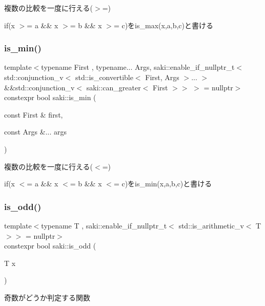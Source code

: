 複数の比較を一度に行える($>$=) 

if(x $>$= a \&\& x $>$= b \&\& x $>$= c)をis\+\_\+max(x,a,b,c)と書ける \mbox{\label{namespacesaki_a761604ec865e518ea0ba335b709be060}} 
\subsubsection{\texorpdfstring{is\+\_\+min()}{is\_min()}}
{\footnotesize\ttfamily template$<$typename First , typename... Args, saki\+::enable\+\_\+if\+\_\+nullptr\+\_\+t$<$ std\+::conjunction\+\_\+v$<$ std\+::is\+\_\+convertible$<$ First, Args $>$... $>$ \&\&std\+::conjunction\+\_\+v$<$ saki\+::can\+\_\+greater$<$ First $>$$>$ $>$  = nullptr$>$ \\
constexpr bool saki\+::is\+\_\+min (\begin{DoxyParamCaption}\item[{const First \&}]{first,  }\item[{const Args \&...}]{args }\end{DoxyParamCaption})}



複数の比較を一度に行える($<$=) 

if(x $<$= a \&\& x $<$= b \&\& x $<$= c)をis\+\_\+min(x,a,b,c)と書ける \mbox{\label{namespacesaki_ae0752a8969900319135a2cb16bb98e2c}} 
\subsubsection{\texorpdfstring{is\+\_\+odd()}{is\_odd()}}
{\footnotesize\ttfamily template$<$typename T , saki\+::enable\+\_\+if\+\_\+nullptr\+\_\+t$<$ std\+::is\+\_\+arithmetic\+\_\+v$<$ T $>$$>$  = nullptr$>$ \\
constexpr bool saki\+::is\+\_\+odd (\begin{DoxyParamCaption}\item[{T}]{x }\end{DoxyParamCaption})}



奇数がどうか判定する関数 

\mbox{\label{namespacesaki_a2168418bb30a857d2d018d0d05c7ace0}} 
